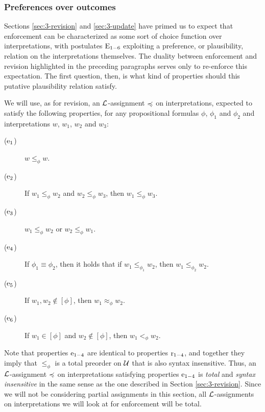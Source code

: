 \subsubsection{Preferences over outcomes}
Sections \ref{sec:3-revision} and \ref{sec:3-update} have primed us
to expect that enforcement can be characterized as some sort of choice
function over interpretations,
with postulates $\mathrm{E}_{1-6}$ exploiting a preference, or plausibility,
relation on the interpretations themselves.
The duality between enforcement and revision highlighted in the preceding paragraphs
serves only to re-enforce this expectation.
The first question, then, is what kind of properties 
should this putative plausibility relation satisfy.

We will use, as for revision, an $\mathcal{L}$-assignment $\preccurlyeq$ on interpretations,
expected to satisfy the following properties, 
for any propositional formulas $\phi$, $\phi_1$ and $\phi_2$ 
and interpretations $w$, $w_1$, $w_2$ and $w_3$:

\begin{description}
	\item[($\mathrm{e}_{1}$)] $w\le_\phi w$.
	\item[($\mathrm{e}_{2}$)] If $w_1\le_\phi w_2$ and $w_2\le_\phi w_3$, then $w_1\le_\phi w_3$.
	\item[($\mathrm{e}_{3}$)] $w_1\le_\phi w_2$ or $w_2\le_\phi w_1$.
	\item[($\mathrm{e}_{4}$)] If $\phi_1\equiv\phi_2$, then it holds that if $w_1\le_{\phi_1}w_2$, then $w_1\le_{\phi_2}w_2$.		
	\item[($\mathrm{e}_{5}$)] If $w_1,w_2\notin[\phi]$, then $w_1\approx_\phi w_2$.
	\item[($\mathrm{e}_{6}$)] If $w_1\in [\phi]$ and $w_2\notin [\phi]$, then $w_1 <_\phi w_2$.
\end{description}

Note that properties $\mathrm{e}_{1-4}$ are identical to properties $\mathrm{r}_{1-4}$,
and together they imply that $\le_\phi$ is a total preorder on $\mathcal{U}$ 
that is also syntax insensitive.
Thus, an $\mathcal{L}$-assignment $\preccurlyeq$ on interpretations
satisfying properties $\mathrm{e}_{1-4}$
is \emph{total} and \emph{syntax insensitive} 
in the same sense as the one 
described in Section \ref{sec:3-revision}.
Since we will not be considering partial assignments 
in this section, all $\mathcal{L}$-assignments on interpretations
we will look at for enforcement will be total.

